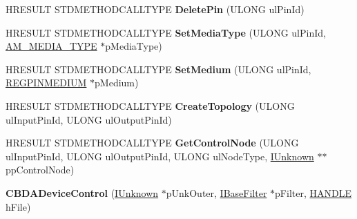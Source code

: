 \begin{DoxyCompactItemize}
H\+R\+E\+S\+U\+LT S\+T\+D\+M\+E\+T\+H\+O\+D\+C\+A\+L\+L\+T\+Y\+PE {\bfseries Delete\+Pin} (U\+L\+O\+NG ul\+Pin\+Id)
\item 
\mbox{\label{class_c_b_d_a_device_control_a96a350ceba63c5de03de22186d630987}} 
H\+R\+E\+S\+U\+LT S\+T\+D\+M\+E\+T\+H\+O\+D\+C\+A\+L\+L\+T\+Y\+PE {\bfseries Set\+Media\+Type} (U\+L\+O\+NG ul\+Pin\+Id, \hyperlink{struct_a_m___m_e_d_i_a___t_y_p_e}{A\+M\+\_\+\+M\+E\+D\+I\+A\+\_\+\+T\+Y\+PE} $\ast$p\+Media\+Type)
\item 
\mbox{\label{class_c_b_d_a_device_control_ac23cb5f862041832e45d34a0569c3b0a}} 
H\+R\+E\+S\+U\+LT S\+T\+D\+M\+E\+T\+H\+O\+D\+C\+A\+L\+L\+T\+Y\+PE {\bfseries Set\+Medium} (U\+L\+O\+NG ul\+Pin\+Id, \hyperlink{struct_r_e_g_p_i_n_m_e_d_i_u_m}{R\+E\+G\+P\+I\+N\+M\+E\+D\+I\+UM} $\ast$p\+Medium)
\item 
\mbox{\label{class_c_b_d_a_device_control_a0d642ca66115cf4c82e5fc5bbe8f04e9}} 
H\+R\+E\+S\+U\+LT S\+T\+D\+M\+E\+T\+H\+O\+D\+C\+A\+L\+L\+T\+Y\+PE {\bfseries Create\+Topology} (U\+L\+O\+NG ul\+Input\+Pin\+Id, U\+L\+O\+NG ul\+Output\+Pin\+Id)
\item 
\mbox{\label{class_c_b_d_a_device_control_a2d1fad22da58dd331125c0cb1cd272e0}} 
H\+R\+E\+S\+U\+LT S\+T\+D\+M\+E\+T\+H\+O\+D\+C\+A\+L\+L\+T\+Y\+PE {\bfseries Get\+Control\+Node} (U\+L\+O\+NG ul\+Input\+Pin\+Id, U\+L\+O\+NG ul\+Output\+Pin\+Id, U\+L\+O\+NG ul\+Node\+Type, \hyperlink{interface_i_unknown}{I\+Unknown} $\ast$$\ast$pp\+Control\+Node)
\item 
\mbox{\label{class_c_b_d_a_device_control_aea7ba4a8c527eeb25c69594501aef258}} 
{\bfseries C\+B\+D\+A\+Device\+Control} (\hyperlink{interface_i_unknown}{I\+Unknown} $\ast$p\+Unk\+Outer, \hyperlink{interface_i_base_filter}{I\+Base\+Filter} $\ast$p\+Filter, \hyperlink{interfacevoid}{H\+A\+N\+D\+LE} h\+File)
\end{DoxyCompactItemize}
